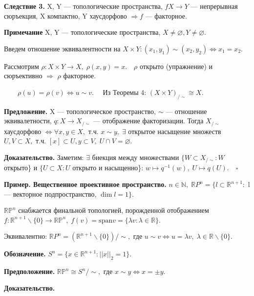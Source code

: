 \documentclass[12pt,a4paper]{article}
\begin{document}
\textbf{Следствие 3.} X, Y --- топологические пространства, $f\! X \to Y$ --- непрерывная сюръекция, X компактно, Y хаусдорфово $\Rightarrow f$ --- факторное.

\textbf{Примечание} X, Y --- топологические пространства, $X \neq \varnothing, Y \neq \varnothing.$

Введем отношение эквивалентности на $X \times Y\!: (x_{1}, y_{1}) \sim (x_{2}, y_{2}) \Leftrightarrow x_{1} = x_{2}.$

Рассмотрим $\rho\!: X \times Y \to X, \; \rho(x, y) = x. \quad \rho$ открыто (упражнение) и сюръективно $\Rightarrow$ $\rho$ факторное.

$\quad \quad \rho(u) = \rho(v) \Leftrightarrow u \sim v. \quad$ Из Теоремы 4: $(X \times Y)_{/\sim} \cong X.$

\textbf{Предложение.} X --- топологическое пространство, $\sim$ --- отношение эквивалетности, $q\!: X \to X_{/\sim}$ --- отображение факторизации. Тогда $X_{/\sim}$ хаусдорфово $\Leftrightarrow \forall x, y \in X,$ т.ч. $x \sim y, \; \exists$ открытое насыщение множеств $U, V \subset X,$ т.ч. $[x] \subset U, y \subset V, \; U \cap V = \varnothing.$

\textbf{Доказательство.} Заметим: $\exists$ биекция между множествами $\{W \subset X_{/\sim}\!: W$ открыто\} и $\{U \subset X\!: U$ открыто и насыщенно\}: $w \mapsto q^{-1}(w), \; U \mapsto q(U). \quad \square$

\textbf{Пример. Вещественное проективное пространство.} $n \in \mathbb{N}, \; \mathbb{R}{P}^{n} = \{l \subset \mathbb{R}^{n + 1}\!:$ l --- векторное подпространство, $\dim l = 1\}.$

$\mathbb{R}\mathbb{P}^{n}$ снабжается финальной топологией, порожденной отображением $f\!: \mathbb{R}^{n + 1}\backslash\{0\} \to \mathbb{R}\mathbb{P}^{n}, \; f(v) = \text{span}{v} = \{\lambda v\!: \lambda \in \mathbb{R}\}.$

Эквивалентно: $\mathbb{R}{P}^{n} = (\mathbb{R}^{n + 1}\backslash\{0\})/\sim,$ где $u \sim v \Leftrightarrow u = \lambda v, \; \lambda \in \mathbb{R}\backslash\{0\}.$

\textbf{Обозначение.} $S^{n} = \{x \in \mathbb{R}^{n + 1}\!: ||x||_{2} = 1\}.$

\textbf{Предположение.} $\mathbb{RP}^{n} \cong S^{n}/\sim,$ где $x \sim y \Leftrightarrow x = \pm y.$

\textbf{Доказательство.}
\end{document}
